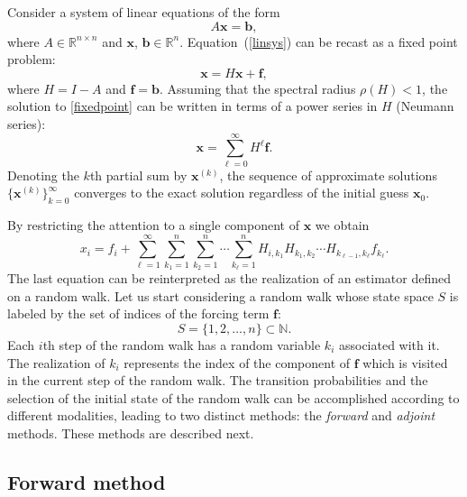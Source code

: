 \documentclass[final,leqno,onefignum,onetabnum]{siamltex1213}
\begin{document}
Consider a system of linear equations of the form
\begin{equation}
A \mathbf{x}=\mathbf{b},
\label{linsys}
\end{equation}
where $A\in \mathbb{R}^{n\times n}$ and $\mathbf{x}$, $\mathbf{b} \in
\mathbb{R}^n$.
Equation~(\ref{linsys}) can be recast as a fixed point problem:
\begin{equation}
 \mathbf{x}=H\mathbf{x}+\mathbf{f},
 \label{fixedpoint}
\end{equation}
where $H=I-A$ and $\mathbf{f}=\mathbf{b}$.
Assuming that the spectral radius $\rho(H)<1$, the solution to
\eqref{fixedpoint} can be written in terms of a power series in
$H$ (Neumann series):
\[
\mathbf{x}=\sum_{\ell=0}^\infty H^\ell\mathbf{f}.
\]
Denoting the $k$th partial sum by $\mathbf{x}^{(k)}$, the sequence of approximate solutions
$\{\mathbf{x}^{(k)}\}_{k=0}^{\infty}$ converges to the exact solution
regardless of the initial guess $\mathbf{x}_0$.

By restricting the attention to a single component of $\mathbf{x}$ we
obtain
\begin{equation}
x_i=f_i + \sum_{\ell=1}^\infty \sum_{k_1=1}^n\sum_{k_2=1}^n\cdots 
\sum_{k_{\ell}=1}^n
H_{i,k_1}H_{k_1,k_2}\cdots H_{k_{\ell-1}, k_{\ell}}f_{k_{\ell}}.
\label{forward}
\end{equation}
The last equation can be reinterpreted as the realization of an estimator
defined on a random walk.  Let us start considering a random walk whose
state space $S$ is labeled by the set of indices of the forcing term
$\mathbf{f}$:
\[
S=\{1,2,\ldots, n\} \subset \mathbb{N}.
\]
Each $i$th step of the random walk has a random variable
$k_i$ associated with it. The realization of $k_i$ represents the index of the
component of $\mathbf{f}$
which is visited in the current step of the random walk.
The transition probabilities and the selection of
the initial state of the random walk can be accomplished according to 
different modalities, leading to two distinct methods:
the \textit{forward} and \textit{adjoint} methods.
These methods are described next.

\subsection{Forward method}
\label{subsec:forward}
\end{document}
